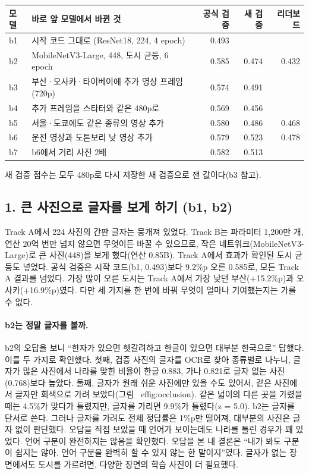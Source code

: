 \documentclass[11pt]{article}
\begin{document}
\begin{center}\footnotesize
\begin{tabular}{llrrr}
\toprule
모델 & 바로 앞 모델에서 바뀐 것 & 공식 검증 & 새 검증 & 리더보드 \\
\midrule
b1 & 시작 코드 그대로 (ResNet18, 224, 4 epoch) & 0.493 & & \\
b2 & MobileNetV3-Large, 448, 도시 균등, 6 epoch & 0.585 & 0.474 & 0.432 \\
b3 & 부산·오사카·타이베이에 추가 영상 프레임(720p) & 0.574 & 0.491 & \\
b4 & 추가 프레임을 스타터와 같은 480p로 & 0.569 & 0.456 & \\
b5 & 서울·도쿄에도 같은 종류의 영상 추가 & 0.580 & 0.486 & 0.468 \\
b6 & 운전 영상과 도톤보리 낮 영상 추가 & 0.579 & 0.523 & 0.478 \\
b7 & b6에서 거리 사진 2배 & 0.582 & 0.513 & \\
\bottomrule
\end{tabular}
\end{center}
새 검증 점수는 모두 480p로 다시 저장한 새 검증으로 잰 값이다(b3 참고).

\subsection*{1. 큰 사진으로 글자를 보게 하기 (b1, b2)}

Track A에서 224 사진의 간판 글자는 뭉개져 있었다. Track B는 파라미터 1,200만 개, 연산 20억 번만 넘지 않으면 무엇이든 바꿀 수 있으므로, 작은 네트워크(MobileNetV3-Large)로 큰 사진(448)을 보게 했다(연산 0.85B). Track A에서 효과가 확인된 도시 균등도 넣었다. 공식 검증은 시작 코드(b1, 0.493)보다 9.2\%p 오른 0.585로, 모든 Track A 결과를 넘었다. 가장 많이 오른 도시는 Track A에서 가장 낮던 부산(+15.2\%p)과 오사카(+16.9\%p)였다. 다만 세 가지를 한 번에 바꿔 무엇이 얼마나 기여했는지는 가를 수 없다.

\paragraph{b2는 정말 글자를 볼까.} b2의 오답을 보니 ``한자가 있으면 헷갈려하고 한글이 있으면 대부분 한국으로'' 답했다. 이를 두 가지로 확인했다. 첫째, 검증 사진의 글자를 OCR로 찾아 종류별로 나누니, 글자가 많은 사진에서 나라를 맞힌 비율이 한글 0.883, 가나 0.821로 글자 없는 사진(0.768)보다 높았다. 둘째, 글자가 원래 쉬운 사진에만 있을 수도 있어서, 같은 사진에서 글자만 회색으로 가려 보았다(그림~
ef{fig:occlusion}). 같은 넓이의 다른 곳을 가렸을 때는 4.5\%가 맞다가 틀렸지만, 글자를 가리면 9.9\%가 틀렸다(z = 5.0). b2는 글자를 단서로 쓴다. 그러나 글자를 가려도 전체 정답률은 1\%p만 떨어져, 대부분의 사진은 글자 없이 판단했다. 오답을 직접 보았을 때 언어가 보이는데도 나라를 틀린 경우가 꽤 있었다. 언어 구분이 완전하지는 않음을 확인했다. 오답을 본 내 결론은 ``내가 봐도 구분이 쉽지는 않아. 언어 구분을 완벽히 할 수 있지 않는 한 말이지''였다. 글자가 없는 장면에서도 도시를 가르려면, 다양한 장면의 학습 사진이 더 필요했다.
\end{document}
